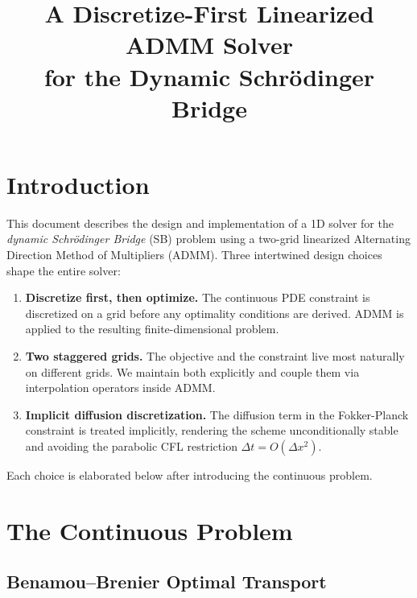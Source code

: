 \documentclass[11pt]{article}
\title{%
  A Discretize-First Linearized ADMM Solver\\
  for the Dynamic Schr\"{o}dinger Bridge
}
\author{}
\date{}
\begin{document}
\maketitle
\tableofcontents
\bigskip

\section{Introduction}

This document describes the design and implementation of a 1D solver for the
\emph{dynamic Schr\"{o}dinger Bridge} (SB) problem using a two-grid
linearized Alternating Direction Method of Multipliers (ADMM).  Three
intertwined design choices shape the entire solver:
\begin{enumerate}
  \item \textbf{Discretize first, then optimize.}  The continuous PDE
        constraint is discretized on a grid before any optimality conditions
        are derived.  ADMM is applied to the resulting finite-dimensional
        problem.
  \item \textbf{Two staggered grids.}  The objective and the constraint live
        most naturally on different grids.  We maintain both explicitly and
        couple them via interpolation operators inside ADMM.
  \item \textbf{Implicit diffusion discretization.}  The diffusion term in
        the Fokker-Planck constraint is treated implicitly, rendering the
        scheme unconditionally stable and avoiding the parabolic CFL
        restriction $\Delta t = O(\Delta x^2)$.
\end{enumerate}
Each choice is elaborated below after introducing the continuous problem.

\section{The Continuous Problem}

\subsection{Benamou--Brenier Optimal Transport}
\end{document}
